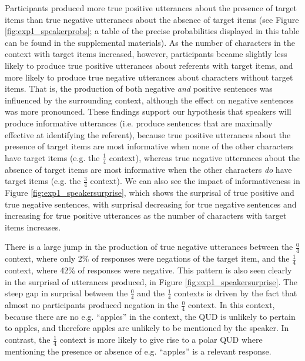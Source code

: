 \documentclass[man, floatsintext, noapacite]{apa6}
\begin{document}
Participants produced more true positive utterances about the presence of target items than true negative utterances about the absence of target items (see Figure \ref{fig:exp1_speakerprobs}; a table of the precise probabilities displayed in this table can be found in the supplemental materials). As the number of characters in the context with target items increased, however, participants became slightly less likely to produce true positive utterances about referents with target items, and more likely to produce true negative utterances about characters without target items. That is, the production of both negative \textit{and} positive sentences was influenced by the surrounding context, although the effect on negative sentences was more pronounced. These findings support our hypothesis that speakers will produce informative utterances (i.e. produce sentences that are maximally effective at identifying the referent), because true positive utterances about the presence of target items are most informative when none of the other characters have target items (e.g. the $\frac{1}{4}$ context), whereas true negative utterances about the absence of target items are most informative when the other characters \textit{do} have target items (e.g. the $\frac{3}{4}$ context). We can also see the impact of informativeness in Figure \ref{fig:exp1_speakersurprise}, which shows the surprisal of true positive and true negative sentences, with surprisal decreasing for true negative sentences and increasing for true positive utterances as the number of characters with target items increases. 

There is a large jump in the production of true negative utterances between the $\frac{0}{4}$ context, where only 2\% of responses were negations of the target item, and the $\frac{1}{4}$ context, where 42\% of responses were negative. This pattern is also seen clearly in the surprisal of utterances produced, in Figure \ref{fig:exp1_speakersurprise}. The steep gap in surprisal between the  $\frac{0}{4}$ and the  $\frac{1}{4}$ contexts is driven by the fact that almost no participants produced negation in the  $\frac{0}{4}$ context. In this context, because there are no e.g. ``apples'' in the context, the QUD is unlikely to pertain to apples, and therefore apples are unlikely to be mentioned by the speaker. In contrast, the $\frac{1}{4}$ context is more likely to give rise to a polar QUD where mentioning the presence or absence of e.g. ``apples'' is a relevant response. 
\end{document}
